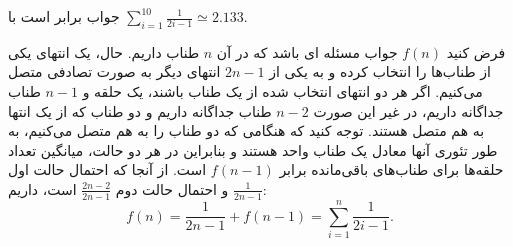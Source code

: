 \begin{solution}


جواب برابر است با \(\sum_{i=1}^{10} \frac{1}{2i-1} \simeq 2.133\).

 فرض کنید \(f(n)\) جواب مسئله ای باشد که در آن \(n\) طناب داریم. حال، یک انتهای یکی از طناب‌ها را انتخاب کرده و به یکی از  \(2n-1\) انتهای دیگر به صورت تصادفی متصل می‌کنیم. اگر هر دو انتهای انتخاب شده از یک طناب باشند، یک حلقه و \(n-1\) طناب جداگانه داریم، در غیر این صورت  \(n-2\) طناب جداگانه داریم و دو طناب که از یک انتها به هم متصل هستند. توجه کنید که هنگامی که دو طناب را به هم متصل می‌کنیم، به طور تئوری آنها معادل یک طناب واحد هستند و بنابراین در هر دو حالت، میانگین تعداد حلقه‌ها برای طناب‌های باقی‌مانده برابر \(f(n-1)\) است. از آنجا که احتمال حالت اول \(\frac{1}{2n-1}\)  و احتمال حالت دوم \(\frac{2n-2}{2n-1}\) است، داریم:
\[ f(n) = \frac{1}{2n-1} + f(n-1) = \sum_{i=1}^{n} \frac{1}{2i-1}. \]
\end{solution}
